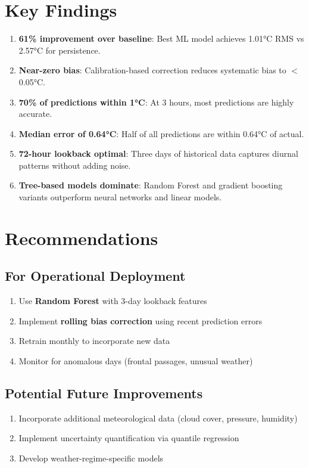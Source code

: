 \documentclass[11pt,letterpaper]{article}
\begin{document}
\section{Key Findings}

\begin{enumerate}
    \item \textbf{61\% improvement over baseline}: Best ML model achieves 1.01°C RMS vs 2.57°C for persistence.

    \item \textbf{Near-zero bias}: Calibration-based correction reduces systematic bias to $<$0.05°C.

    \item \textbf{70\% of predictions within 1°C}: At 3 hours, most predictions are highly accurate.

    \item \textbf{Median error of 0.64°C}: Half of all predictions are within 0.64°C of actual.

    \item \textbf{72-hour lookback optimal}: Three days of historical data captures diurnal patterns without adding noise.

    \item \textbf{Tree-based models dominate}: Random Forest and gradient boosting variants outperform neural networks and linear models.
\end{enumerate}

\section{Recommendations}

\subsection{For Operational Deployment}
\begin{enumerate}[noitemsep]
    \item Use \textbf{Random Forest} with 3-day lookback features
    \item Implement \textbf{rolling bias correction} using recent prediction errors
    \item Retrain monthly to incorporate new data
    \item Monitor for anomalous days (frontal passages, unusual weather)
\end{enumerate}

\subsection{Potential Future Improvements}
\begin{enumerate}[noitemsep]
    \item Incorporate additional meteorological data (cloud cover, pressure, humidity)
    \item Implement uncertainty quantification via quantile regression
    \item Develop weather-regime-specific models
\end{enumerate}
\end{document}
